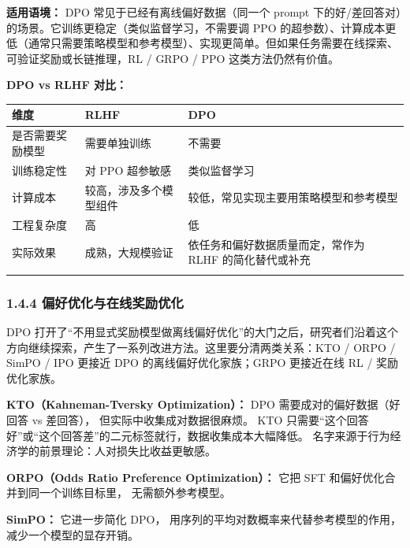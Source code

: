 \documentclass[
  chinese,
]{ctexart}
\begin{document}
\textbf{适用语境：} DPO 常见于已经有离线偏好数据（同一个 prompt
下的好/差回答对）的场景。它训练更稳定（类似监督学习，不需要调 PPO
的超参数）、计算成本更低（通常只需要策略模型和参考模型）、实现更简单。但如果任务需要在线探索、可验证奖励或长链推理，RL
/ GRPO / PPO 这类方法仍然有价值。

\textbf{DPO vs RLHF 对比：}

\begin{center}
\begin{tabular}{@{}>{\raggedright\arraybackslash}p{} >{\raggedright\arraybackslash}p{} >{\raggedright\arraybackslash}p{}@{}}
\toprule\noalign{}
维度 & RLHF & DPO \\
\midrule\noalign{}
是否需要奖励模型 & 需要单独训练 & 不需要 \\
训练稳定性 & 对 PPO 超参敏感 & 类似监督学习 \\
计算成本 & 较高，涉及多个模型组件 & 较低，常见实现主要用策略模型和参考模型 \\
工程复杂度 & 高 & 低 \\
实际效果 & 成熟，大规模验证 & 依任务和偏好数据质量而定，常作为 RLHF 的简化替代或补充 \\
\bottomrule\noalign{}
\end{tabular}
\end{center}

\subsubsection{1.4.4
偏好优化与在线奖励优化}\label{ux504fux597dux4f18ux5316ux4e0eux5728ux7ebfux5956ux52b1ux4f18ux5316}

DPO
打开了``不用显式奖励模型做离线偏好优化''的大门之后，研究者们沿着这个方向继续探索，产生了一系列改进方法。这里要分清两类关系：KTO
/ ORPO / SimPO / IPO 更接近 DPO 的离线偏好优化家族；GRPO 更接近在线 RL /
奖励优化家族。

\textbf{KTO（Kahneman-Tversky Optimization）：} DPO
需要成对的偏好数据（好回答 vs 差回答）， 但实际中收集成对数据很麻烦。
KTO
只需要``这个回答好''或``这个回答差''的二元标签就行，数据收集成本大幅降低。
名字来源于行为经济学的前景理论：人对损失比收益更敏感。

\textbf{ORPO（Odds Ratio Preference Optimization）：} 它把 SFT
和偏好优化合并到同一个训练目标里， 无需额外参考模型。

\textbf{SimPO：} 它进一步简化 DPO，
用序列的平均对数概率来代替参考模型的作用，减少一个模型的显存开销。
\end{document}
